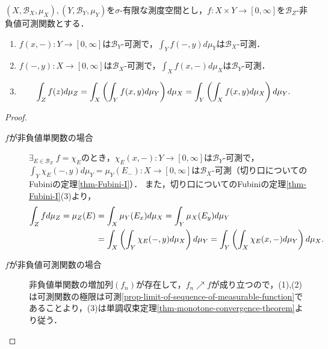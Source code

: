 \documentclass[uplatex, dvipdfmx]{jsreport}
\renewcommand{\B}{\mathcal{B}}
\begin{document}
\begin{theorem}\label{thm-Fubini-II}
    $(X,\B_X,\mu_X),(Y,\B_Y,\mu_Y)$を$\sigma$-有限な測度空間とし，$f:X\times Y\to[0,\infty]$を$\B_Z$-非負値可測関数とする．
    \begin{enumerate}
        \item $f(x,-):Y\to[0,\infty]$は$\B_Y$-可測で，$\int_Yf(-,y)d\mu_Y$は$\B_X$-可測．
        \item $f(-,y):X\to[0,\infty]$は$\B_X$-可測で，$\int_Xf(x,-)d\mu_X$は$\B_Y$-可測．
        \item \[\int_{Z}f(z)d\mu_Z=\int_X\left(\int_Yf(x,y)d\mu_Y\right)d\mu_X=\int_Y\left(\int_Xf(x,y)d\mu_X\right)d\mu_Y.\]
    \end{enumerate}
\end{theorem}
\begin{proof}\mbox{}
    \begin{description}
        \item[$f$が非負値単関数の場合] $\exists_{E\in\B_Z}\;f=\chi_E$のとき，$\chi_E(x,-):Y\to[0,\infty]$は$\B_Y$-可測で，$\int_Y\chi_E(-,y)d\mu_Y=\mu_Y(E_-):X\to[0,\infty]$は$\B_X$-可測（切り口についてのFubiniの定理\ref{thm-Fubini-I}）．
        また，切り口についてのFubiniの定理\ref{thm-Fubini-I}(3)より，
        \begin{align*}
            \int_Zfd\mu_Z=\mu_Z(E)&=\int_X\mu_Y(E_x)d\mu_X=\int_Y\mu_X(E_y)d\mu_Y\\
            &=\int_X\left(\int_Y\chi_E(-,y)d\mu_X\right)d\mu_Y=\int_Y\left(\int_X\chi_E(x,-)d\mu_Y\right)d\mu_X.
        \end{align*}
        \item[$f$が非負値可測関数の場合] 
        非負値単関数の増加列$(f_n)$が存在して，$f_n\nearrow f$が成り立つので，(1),(2)は可測関数の極限は可測\ref{prop-limit-of-sequence-of-measurable-function}であることより，(3)は単調収束定理\ref{thm-monotone-convergence-theorem}より従う．
    \end{description}
\end{proof}
\end{document}
